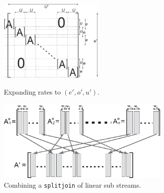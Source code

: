     

\begin{figure}
\vspace{-12pt}
    \begin{minipage}{2.5in}
      \includegraphics[height=1.6in]{cag-commit-streamit-linear-expand.eps}
      \vspace{-6pt}
      \noindent \caption{Expanding rates to $(e', o', u')$.
        \label{fig:cag-commit-streamit-linear-combo-a}}
    \end{minipage}
    \begin{minipage}{3.5in}
      \includegraphics[height=1.6in]{cag-commit-streamit-linear-sjcombo.eps}
      \vspace{-6pt}
      \noindent \protect\hspace{1in}\caption{Combining a {\tt splitjoin} of linear sub streams.
        \label{fig:cag-commit-streamit-linear-combo-b}}
    \end{minipage}
  \vspace{-12pt}
\end{figure}

